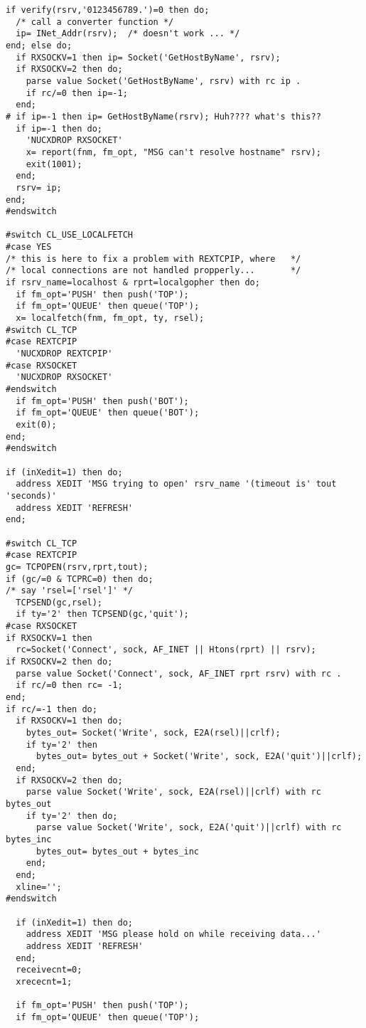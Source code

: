 \begin{verbatim}
if verify(rsrv,'0123456789.')=0 then do;
  /* call a converter function */
  ip= INet_Addr(rsrv);  /* doesn't work ... */
end; else do;
  if RXSOCKV=1 then ip= Socket('GetHostByName', rsrv);
  if RXSOCKV=2 then do;
    parse value Socket('GetHostByName', rsrv) with rc ip .
    if rc/=0 then ip=-1;
  end;
# if ip=-1 then ip= GetHostByName(rsrv); Huh???? what's this??
  if ip=-1 then do;
    'NUCXDROP RXSOCKET'
    x= report(fnm, fm_opt, "MSG can't resolve hostname" rsrv);
    exit(1001);
  end;
  rsrv= ip;
end;
#endswitch

#switch CL_USE_LOCALFETCH
#case YES
/* this is here to fix a problem with REXTCPIP, where   */
/* local connections are not handled propperly...       */
if rsrv_name=localhost & rprt=localgopher then do;
  if fm_opt='PUSH' then push('TOP');
  if fm_opt='QUEUE' then queue('TOP');
  x= localfetch(fnm, fm_opt, ty, rsel);
#switch CL_TCP
#case REXTCPIP
  'NUCXDROP REXTCPIP'
#case RXSOCKET
  'NUCXDROP RXSOCKET'
#endswitch
  if fm_opt='PUSH' then push('BOT');
  if fm_opt='QUEUE' then queue('BOT');
  exit(0);
end;
#endswitch

if (inXedit=1) then do;
  address XEDIT 'MSG trying to open' rsrv_name '(timeout is' tout 'seconds)'
  address XEDIT 'REFRESH'
end;

#switch CL_TCP
#case REXTCPIP
gc= TCPOPEN(rsrv,rprt,tout);
if (gc/=0 & TCPRC=0) then do;
/* say 'rsel=['rsel']' */
  TCPSEND(gc,rsel);
  if ty='2' then TCPSEND(gc,'quit');
#case RXSOCKET
if RXSOCKV=1 then
  rc=Socket('Connect', sock, AF_INET || Htons(rprt) || rsrv);
if RXSOCKV=2 then do;
  parse value Socket('Connect', sock, AF_INET rprt rsrv) with rc .
  if rc/=0 then rc= -1;
end;
if rc/=-1 then do;
  if RXSOCKV=1 then do;
    bytes_out= Socket('Write', sock, E2A(rsel)||crlf);
    if ty='2' then
      bytes_out= bytes_out + Socket('Write', sock, E2A('quit')||crlf);
  end;
  if RXSOCKV=2 then do;
    parse value Socket('Write', sock, E2A(rsel)||crlf) with rc bytes_out
    if ty='2' then do;
      parse value Socket('Write', sock, E2A('quit')||crlf) with rc bytes_inc
      bytes_out= bytes_out + bytes_inc
    end;
  end;
  xline='';
#endswitch

  if (inXedit=1) then do;
    address XEDIT 'MSG please hold on while receiving data...'
    address XEDIT 'REFRESH'
  end;
  receivecnt=0;
  xrececnt=1;

  if fm_opt='PUSH' then push('TOP');
  if fm_opt='QUEUE' then queue('TOP');


\end{verbatim}
